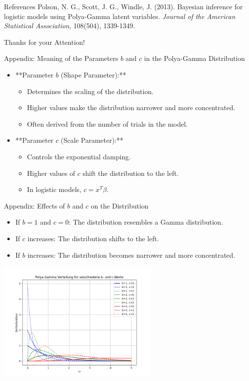 \documentclass{beamer}
\begin{document}
	
	\begin{frame}{References}
		Polson, N. G., Scott, J. G., Windle, J. (2013). Bayesian inference for logistic models using Polya-Gamma latent variables. \textit{Journal of the American Statistical Association}, 108(504), 1339-1349.
	\end{frame}
	
	\begin{frame}
		Thanks for your Attention!
	\end{frame}
	
	
	\begin{frame}{Appendix: Meaning of the Parameters $b$ and $c$ in the Polya-Gamma Distribution}
		\begin{itemize}
			\item **Parameter $b$ (Shape Parameter):**
			\begin{itemize}
				\item Determines the scaling of the distribution.
				\item Higher values make the distribution narrower and more concentrated.
				\item Often derived from the number of trials in the model.
			\end{itemize}
			\item **Parameter $c$ (Scale Parameter):**
			\begin{itemize}
				\item Controls the exponential damping.
				\item Higher values of $c$ shift the distribution to the left.
				\item In logistic models, $c = x^T \beta$.
			\end{itemize}
		\end{itemize}
	\end{frame}
	
	\begin{frame}{Appendix: Effects of $b$ and $c$ on the Distribution}
		\begin{itemize}
			\item If $b = 1$ and $c = 0$: The distribution resembles a Gamma distribution.
			\item If $c$ increases: The distribution shifts to the left.
			\item If $b$ increases: The distribution becomes narrower and more concentrated.
		\end{itemize}
		\centering
		\includegraphics[width=0.6\textwidth]{polya_gamma_distribution.png}
	\end{frame}
	
\end{document}
